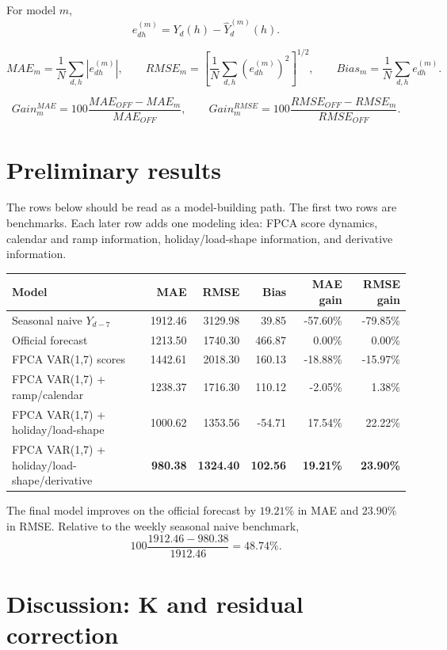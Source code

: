 \documentclass[10pt,a4paper]{article}
\begin{document}
For model \(m\),
\[
e_{dh}^{(m)}=Y_d(h)-\widehat Y_d^{(m)}(h).
\]

\[
MAE_m=\frac{1}{N}\sum_{d,h}|e_{dh}^{(m)}|,
\qquad
RMSE_m=
\left[
\frac{1}{N}\sum_{d,h}(e_{dh}^{(m)})^2
\right]^{1/2},
\qquad
Bias_m=\frac{1}{N}\sum_{d,h}e_{dh}^{(m)}.
\]

\[
Gain_m^{MAE}=100\frac{MAE_{OFF}-MAE_m}{MAE_{OFF}},
\qquad
Gain_m^{RMSE}=100\frac{RMSE_{OFF}-RMSE_m}{RMSE_{OFF}}.
\]

\section*{Preliminary results}

The rows below should be read as a model-building path. The first two rows are
benchmarks. Each later row adds one modeling idea: FPCA score dynamics, calendar and
ramp information, holiday/load-shape information, and derivative information.

\begin{center}
\fontsize{8.2}{9.5}\selectfont
\begin{tabular}{p{}rrrrr}
\hline
Model & MAE & RMSE & Bias & MAE gain & RMSE gain\\
\hline
Seasonal naive \(Y_{d-7}\) & 1912.46 & 3129.98 & 39.85 & -57.60\% & -79.85\%\\
Official forecast & 1213.50 & 1740.30 & 466.87 & 0.00\% & 0.00\%\\
FPCA VAR(1,7) scores & 1442.61 & 2018.30 & 160.13 & -18.88\% & -15.97\%\\
FPCA VAR(1,7) + ramp/calendar & 1238.37 & 1716.30 & 110.12 & -2.05\% & 1.38\%\\
FPCA VAR(1,7) + holiday/load-shape & 1000.62 & 1353.56 & -54.71 & 17.54\% & 22.22\%\\
FPCA VAR(1,7) + holiday/load-shape/derivative & {\bf 980.38} & {\bf 1324.40} & {\bf 102.56} & {\bf 19.21\%} & {\bf 23.90\%}\\
\hline
\end{tabular}
\end{center}

\fontsize{9.2}{10.8}\selectfont

The final model improves on the official forecast by \(19.21\%\) in MAE and \(23.90\%\) in RMSE. Relative to the weekly seasonal naive benchmark,
\[
100\frac{1912.46-980.38}{1912.46}=48.74\%.
\]

\section*{Discussion: K and residual correction}
\end{document}
